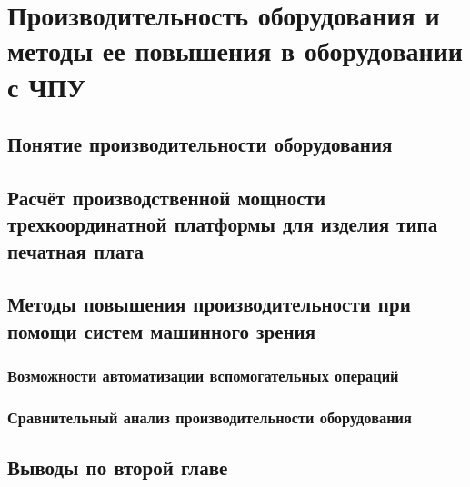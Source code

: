 \chapter{Производительность оборудования и методы ее повышения в оборудовании с ЧПУ} \label{chapt2}

\section{Понятие производительности оборудования} \label{sect2_1}

\section{Расчёт производственной мощности трехкоординатной платформы для изделия типа печатная плата} \label{sect2_2}

\section{Методы повышения производительности при помощи систем машинного зрения} \label{sect2_3}

\subsection{Возможности автоматизации вспомогательных операций} \label{ssect2_3_1}

\subsection{Сравнительный анализ производительности оборудования} \label{ssect2_3_2}

\section{Выводы по второй главе} \label{sect2_4}

